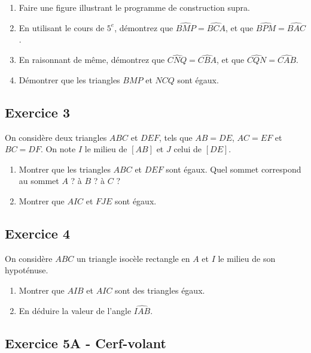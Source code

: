 \documentclass[12 pt]{extarticle}
\theoremstyle{plain}
\begin{document}
 \begin{enumerate}
 \item Faire une figure illustrant le programme de construction supra. 
 \item En utilisant le cours de $5^e$, démontrez que $\widehat{BMP}=\widehat{BCA}$, et que $\widehat{BPM}= \widehat{BAC}$. 
 \item En raisonnant de même, démontrez que $\widehat{CNQ}=\widehat{CBA}$, et que $\widehat{CQN}= \widehat{CAB}$. 
 \item Démontrer que les triangles $BMP$ et $NCQ$ sont égaux. 
 \end{enumerate}
 
 
 
 
 
 
\subsection*{Exercice 3}
 
On considère deux triangles $ABC$ et $DEF$, tels que $AB= DE$, $AC=EF$ et $BC=DF$. On note $I$ le milieu de $[AB]$ et $J$ celui de $[DE]$. 

\begin{enumerate}
\item Montrer que les triangles $ABC$ et $DEF$ sont égaux. Quel sommet correspond au sommet $A$ ? à $B$ ? à $C$ ? 

\item Montrer que $AIC$ et $FJE$ sont égaux. 

\end{enumerate} 
 
 
\subsection*{Exercice 4}
 
 On considère $ABC$ un triangle isocèle rectangle en $A$ et $I$ le milieu de son hypoténuse. 
 \begin{enumerate}
 
 \item Montrer que $AIB$ et $AIC$ sont des triangles égaux. 
 \item En déduire la valeur de l'angle $\widehat{IAB}$. 
 \end{enumerate}
 
 
 \subsection*{Exercice 5A - Cerf-volant}
 
\end{document}
